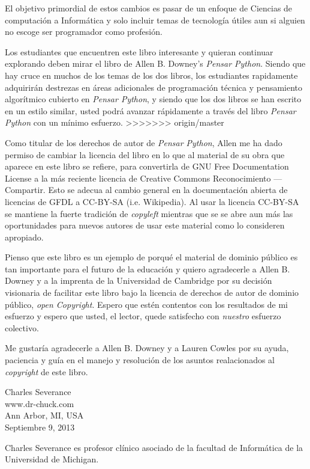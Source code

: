 El objetivo primordial de estos cambios es pasar de un enfoque de Ciencias de computaci\'on a Inform\'atica y solo incluir temas de tecnolog\'ia \'utiles aun si alguien no escoge ser programador como profesi\'on.

Los estudiantes que encuentren este libro interesante y quieran continuar explorando deben mirar el libro de Allen B. Downey's \emph{Pensar Python}. Siendo que hay cruce en muchos de los temas de los dos libros,
los estudiantes rapidamente adquirir\'an destrezas en \'areas adicionales de programaci\'on t\'ecnica y pensamiento algor\'itmico cubierto en \emph{Pensar Python}, y siendo que los dos libros se han escrito en un estilo similar, usted podr\'a avanzar r\'apidamente a trav\'es del libro \emph{Pensar Python} con un m\'inimo esfuerzo.
>>>>>>> origin/master

Como titular de los derechos de autor de \emph{Pensar Python},
Allen me ha dado permiso de cambiar la licencia del libro en lo que al material de su obra que aparece en este libro se refiere, para convertirla de GNU Free Documentation License 
a la m\'as reciente licencia de Creative Commons Reconocimiento --- Compartir. Esto se adecua al cambio general en la documentaci\'on abierta de licencias de GFDL a CC-BY-SA (i.e. Wikipedia).
Al usar la licencia CC-BY-SA se mantiene la fuerte tradici\'on de \textit{copyleft} mientras  que se se abre aun m\'as las oportunidades para nuevos autores de usar este material como lo consideren apropiado.

Pienso que este libro es un ejemplo de porqu\'e el material de dominio p\'ublico es tan importante para el futuro de la educaci\'on y quiero agradecerle a Allen B. Downey y a la imprenta de la Universidad de Cambridge por su decisi\'on visionaria de facilitar este libro bajo la licencia de derechos de autor de dominio p\'ublico, \textit{open Copyright}. Espero que est\'en contentos con los resultados de mi esfuerzo y espero que usted, el lector, quede satisfecho con \emph{nuestro} esfuerzo colectivo.

Me gustar\'ia agradecerle a Allen B. Downey y a Lauren Cowles por su ayuda,
paciencia y gu\'ia en el manejo y resoluci\'on de los asuntos realacionados al \textit{copyright} de este libro.

Charles Severance\\
www.dr-chuck.com\\
Ann Arbor, MI, USA\\
Septiembre 9, 2013

Charles Severance es profesor cl\'inico asociado de la facultad de Inform\'atica de la Universidad de Michigan.

\clearemptydoublepage

\begin{latexonly}

\tableofcontents

\clearemptydoublepage

\end{latexonly}

\mainmatter


